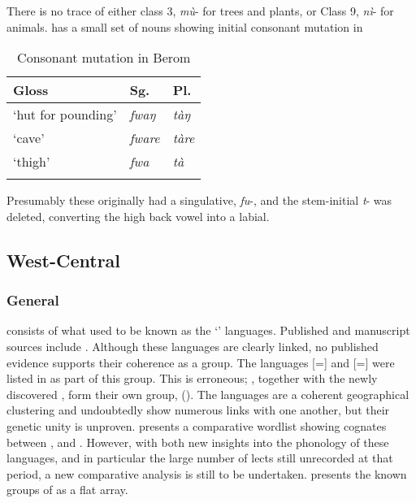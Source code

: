 \documentclass[output=paper]{langsci/langscibook}
\begin{document}
There is no trace of either  class 3, \textit{mù}- for trees and plants, or Class 9, \textit{nì}- for animals.  has a small set of nouns showing initial consonant mutation in  

\begin{table}
\caption{Consonant mutation in Berom}
\label{extab:nomaffplat:9}
\begin{tabularx}{.8\textwidth}{XXl}
\lsptoprule
Gloss 	& {Sg.} 	&  {Pl.}\\
\midrule
‘hut for pounding’ 	& \textit{fwaŋ} 	& \textit{tàŋ}\\
‘cave’ 	& \itshape fware 	& \itshape tàre\\
‘thigh’ 	& \itshape fwa 	& \itshape tà\\
\lspbottomrule
\end{tabularx}
\end{table}


Presumably these originally had a singulative, \textit{fu}-, and the stem-initial \textit{t}- was deleted, converting the high back vowel into a labial.

\subsection{West-Central} %
\subsubsection{General}

 consists of what used to be known as the ‘’ languages. Published and manuscript sources include \citet{Koelle1854,Gerhardt1971,Gerhardt1974,Gerhardt1983a,Gerhardt1994,AdwiraahHagen1983,Adwiraah1989,McKinney1979,McKinney1983,Norris1984,Norris1990,Follingstad1991,Follingstadnd}. Although these languages are clearly linked, no published evidence supports their coherence as a group. The languages  [=] and  [=] were listed in \citet{CrozierBlench1992} as part of this group. This is erroneous; , together with the newly discovered , form their own group,  (). The  languages are a coherent geographical clustering and undoubtedly show numerous links with one another, but their genetic unity is unproven. \citet[67ff]{Gerhardt1983a} presents a comparative wordlist showing cognates between ,  and . However, with both new insights into the phonology of these languages, and in particular the large number of lects still unrecorded at that period, a new comparative analysis is still to be undertaken.  presents the known groups of  as a flat array.
\end{document}
